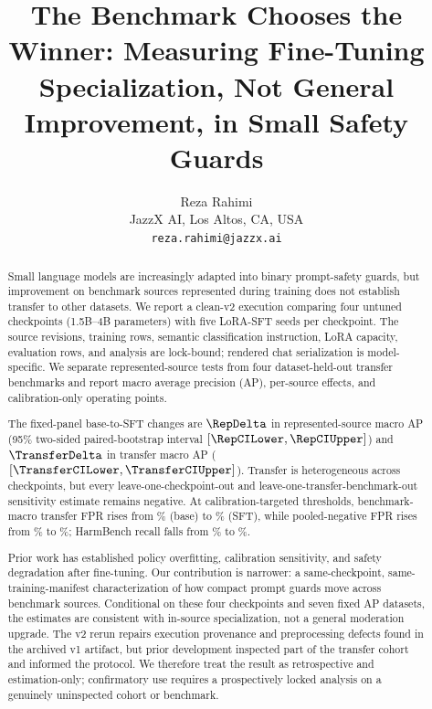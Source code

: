 \documentclass[11pt]{article}
\begin{document}
\title{The Benchmark Chooses the Winner: Measuring Fine-Tuning Specialization, Not General Improvement, in Small Safety Guards}

\author{Reza Rahimi\\
  \small JazzX AI, Los Altos, CA, USA\\
  \small\texttt{reza.rahimi@jazzx.ai}}
\date{}

\maketitle

\begin{abstract}
Small language models are increasingly adapted into binary prompt-safety guards, but improvement on benchmark sources represented during training does not establish transfer to other datasets. We report a clean-v2 execution comparing four untuned checkpoints (1.5B--4B parameters) with five LoRA-SFT seeds per checkpoint. The source revisions, training rows, semantic classification instruction, LoRA capacity, evaluation rows, and analysis are lock-bound; rendered chat serialization is model-specific. We separate represented-source tests from four dataset-held-out transfer benchmarks and report macro average precision (AP), per-source effects, and calibration-only operating points.

The fixed-panel base-to-SFT changes are $\RepDelta$ in represented-source macro AP (95\% two-sided paired-bootstrap interval $[\RepCILower,\RepCIUpper]$) and $\TransferDelta$ in transfer macro AP ($[\TransferCILower,\TransferCIUpper]$). Transfer is heterogeneous across checkpoints, but every leave-one-checkpoint-out and leave-one-transfer-benchmark-out sensitivity estimate remains negative. At calibration-targeted thresholds, benchmark-macro transfer FPR rises from \TransferBaseFPRPct\% (base) to \TransferSFTFPRPct\% (SFT), while pooled-negative FPR rises from \TransferBasePooledFPRPct\% to \TransferSFTPooledFPRPct\%; HarmBench recall falls from \HarmBenchBaseRecallPct\% to \HarmBenchSFTRecallPct\%.

Prior work has established policy overfitting, calibration sensitivity, and safety degradation after fine-tuning. Our contribution is narrower: a same-checkpoint, same-training-manifest characterization of how compact prompt guards move across benchmark sources. Conditional on these four checkpoints and seven fixed AP datasets, the estimates are consistent with in-source specialization, not a general moderation upgrade. The v2 rerun repairs execution provenance and preprocessing defects found in the archived v1 artifact, but prior development inspected part of the transfer cohort and informed the protocol. We therefore treat the result as retrospective and estimation-only; confirmatory use requires a prospectively locked analysis on a genuinely uninspected cohort or benchmark.
\end{abstract}
\end{document}

